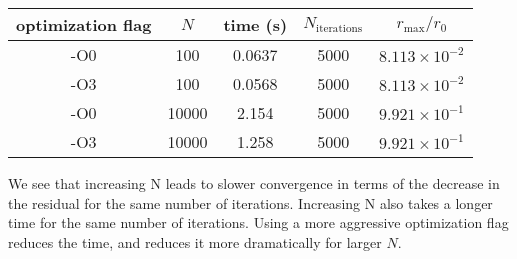 \documentclass[12]{article}
\begin{document}
\begin{enumerate}[label=\textbf{\arabic*}.]
\begin{enumerate}[label=\alph*.]
   \vspace{1em}
   \begin{tabular}{ c c | c c c }
         optimization flag & $N$ & time (s) & $N_\mathrm{iterations}$ & $r_\mathrm{max}/r_0$ \\ 
         \hline
         -O0 & 100 & 0.0637 & 5000 & $8.113 \times 10^{-2}$ \\  
         -O3 & 100 & 0.0568 & 5000 & $8.113 \times 10^{-2}$ \\ 
         -O0 & 10000 & 2.154 & 5000 & $9.921 \times 10^{-1}$ \\  
         -O3 & 10000 & 1.258 & 5000 &  $9.921 \times 10^{-1}$
     \end{tabular}
     \vspace{1em}
     
     We see that increasing N leads to slower convergence in terms of the decrease in the residual for the same number of iterations. 
     Increasing N also takes a longer time for the same number of iterations.
     Using a more aggressive optimization flag reduces the time, and reduces it more dramatically for larger $N$.

 \end{enumerate}

\end{enumerate}


 
\end{document}
